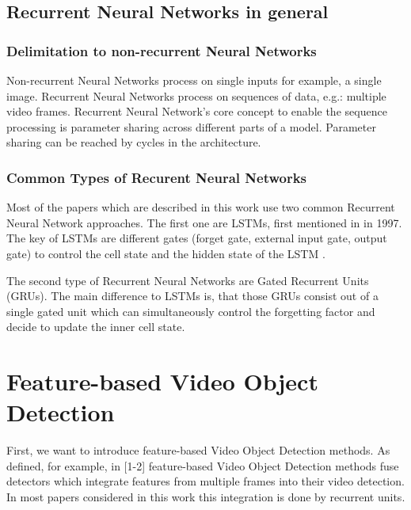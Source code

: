\documentclass[conference]{IEEEtran}
\begin{document}
\subsection{Recurrent Neural Networks in general}
\subsubsection{Delimitation to non-recurrent Neural Networks} 
Non-recurrent Neural Networks process on single inputs for example, a single image. Recurrent Neural Networks process on sequences of data, e.g.: multiple video frames. Recurrent Neural Network's core concept to enable the sequence processing is parameter sharing across different parts of a model. Parameter sharing can be reached by cycles in the architecture. \cite{b11} \newline

\subsubsection{Common Types of Recurent Neural Networks}
Most of the papers which are described in this work use two common Recurrent Neural Network approaches. The first one are LSTMs, first mentioned in \cite{b18} in 1997. The key of LSTMs are different gates (forget gate, external input gate, output gate) to control the cell state and the hidden state of the LSTM \cite{b11}.  \newline

The second type of Recurrent Neural Networks are Gated Recurrent Units (GRUs). The main difference to LSTMs is, that those GRUs consist out of a single gated unit which can simultaneously control the forgetting factor and decide to update the inner cell state. \cite{b11} 

\section{Feature-based Video Object Detection}

First, we want to introduce feature-based Video Object Detection methods. As defined, for example, in [1-2] feature-based Video Object Detection methods fuse detectors which integrate features from multiple frames into their video detection. In most papers considered in this work this integration is done by recurrent units.  
\end{document}
